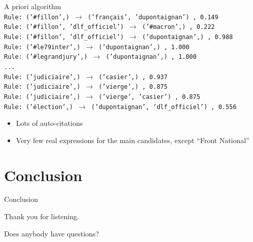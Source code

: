 \documentclass{beamer}
\begin{document}
\begin{frame}{A priori algorithm}
\begingroup
\fontsize{9pt}{12pt}
\texttt{\\
Rule: ('\#fillon',) $\to$ ('français', 'dupontaignan') , 0.149\\
Rule: ('\#fillon', 'dlf\_officiel') $\to$ ('\#macron',) , 0.222\\
Rule: ('\#fillon', 'dlf\_officiel') $\to$ ('dupontaignan',) , 0.988\\
Rule: ('\#le79inter',) $\to$ ('dupontaignan',) , 1.000\\
Rule: ('\#legrandjury',) $\to$ ('dupontaignan',) , 1.000\\
...\\
Rule: ('judiciaire',) $\to$ ('casier',) , 0.937\\
Rule: ('judiciaire',) $\to$ ('vierge',) , 0.875\\
Rule: ('judiciaire',) $\to$ ('vierge', 'casier') , 0.875\\
Rule: ('élection',) $\to$ ('dupontaignan', 'dlf\_officiel') , 0.556\\
}
\endgroup


\begin{itemize}
\item Lots of auto-citations
\item Very few real expressions for the main candidates, except ``Front National''
\end{itemize}
\end{frame}


\section{Conclusion}
\begin{frame}{Conclusion}
\begin{center}
Thank you for listening. 
\bigskip


Does anybody have questions?
\end{center}
\end{frame}
 
\end{document}
